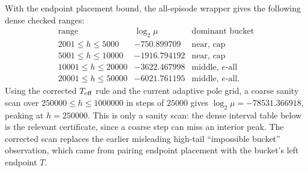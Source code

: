 With the endpoint placement bound, the all-episode wrapper gives the following dense checked ranges:
\[
\begin{array}{c|c|c}
\text{range} & \log_2\mu & \text{dominant bucket}\\
\hline
2001\le h\le5000 & -750.899709 & \text{near, cap}\\
5001\le h\le10000 & -1916.794192 & \text{near, cap}\\
10001\le h\le20000 & -3622.467998 & \text{middle, }e\text{-all}\\
20001\le h\le50000 & -6021.761195 & \text{middle, }e\text{-all}.
\end{array}
\]
Using the corrected \(T_{\rm eff}\) rule and the current adaptive pole grid, a coarse sanity scan over
\(250000\le h\le1000000\) in steps of \(25000\) gives \(\log_2\mu=-78531.366918\), peaking at \(h=250000\).
This is only a sanity scan: the dense interval table below is the relevant certificate, since a coarse step can miss an
interior peak.  The corrected scan replaces the earlier misleading high-tail ``impossible bucket'' observation, which
came from pairing endpoint placement with the bucket's left endpoint \(T\).

